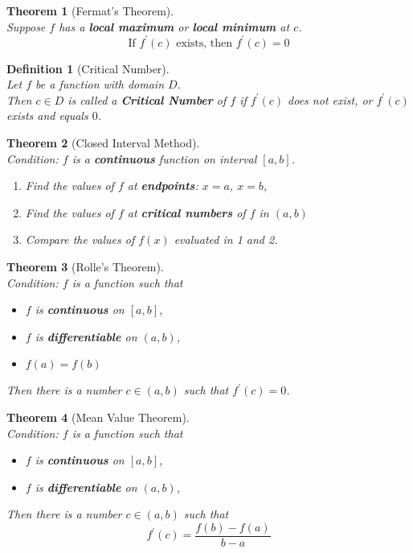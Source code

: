 \documentclass[12pt]{article}
\newtheorem{definition}{Definition}[section]
\newtheorem{theorem}{Theorem}[section]
\theoremstyle{definition}
\begin{document}
\begin{theorem}[Fermat's Theorem]
\hfill\\
\normalfont Suppose $f$ has a \textbf{local maximum} or \textbf{local minimum} at $c$.
\[
\text{If }f^\prime (c)\text{ exists, then }f^\prime (c)=0
\]
\end{theorem}
\begin{definition}[Critical Number]
\hfill\\
\normalfont Let $f$ be a function with domain $D$.\\
Then $c \in D$ is called a \textbf{Critical Number} of $f$ if
 $f^\prime (c)$ does not exist, or $f^\prime (c)$ exists and equals $0$.
\end{definition}
\begin{theorem}[Closed Interval Method]
\hfill\\
\normalfont Condition: $f$ is a \textbf{continuous} function on interval $[a, b]$. 
\begin{enumerate}
\item Find the values of $f$ at \textbf{endpoints}: $x = a$, $x = b$,
\item Find the values of $f$ at \textbf{critical numbers} of $f$ in $(a, b)$
\item Compare the values of $f(x)$ evaluated in 1 and 2.
\end{enumerate}
\end{theorem}
\begin{theorem}[Rolle's Theorem]
\hfill\\
\normalfont Condition: $f$ is a function such that
\begin{itemize}
\item $f$ is \textbf{continuous} on $[a,b]$,
\item $f$ is \textbf{differentiable} on $(a,b)$,
\item $f(a)=f(b)$
\end{itemize}
Then there is a number $c\in(a,b)$ such that $f^\prime (c)=0$.
\end{theorem}
\begin{theorem}[Mean Value Theorem]
\hfill\\
\normalfont Condition: $f$ is a function such that
\begin{itemize}
\item $f$ is \textbf{continuous} on $[a,b]$,
\item $f$ is \textbf{differentiable} on $(a,b)$,
\end{itemize}
Then there is a number $c\in(a,b)$ such that
\[
f^\prime (c)=\frac{f(b)-f(a)}{b-a}
\]
\end{theorem}
\end{document}
